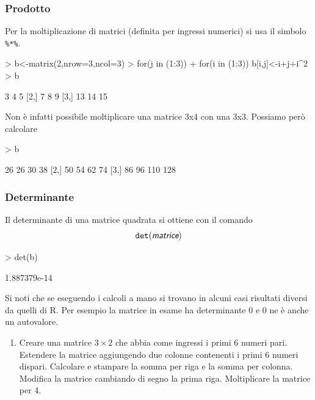 \documentclass[onecolumn,11pt]{book}
\newcommand{\varia}[1]{\textsl{\textsf{#1}}}
\begin{document}
\subsubsection{Prodotto}
Per la  moltiplicazione di matrici (definita per ingressi numerici) si usa il simbolo \texttt{\%*\%}.
\begin{Schunk}
\begin{Sinput}
> b<-matrix(2,nrow=3,ncol=3)
> for(j in (1:3)) 
+ for(i in (1:3)) b[i,j]<-i+j+i^2
> b
\end{Sinput}
\begin{Soutput}
     [,1] [,2] [,3]
[1,]    3    4    5
[2,]    7    8    9
[3,]   13   14   15
\end{Soutput}
\end{Schunk}
Non \`e infatti possibile moltiplicare una matrice 3x4 con una 3x3. Possiamo per\`o calcolare
\begin{Schunk}
\begin{Sinput}
> b%
\end{Sinput}
\begin{Soutput}
     [,1] [,2] [,3] [,4]
[1,]   26   26   30   38
[2,]   50   54   62   74
[3,]   86   96  110  128
\end{Soutput}
\end{Schunk}
\subsubsection{Determinante} Il determinante di una matrice quadrata si ottiene con il comando
\begin{equation}\texttt{det} (\varia{matrice})\end{equation}
\begin{Schunk}
\begin{Sinput}
> det(b)
\end{Sinput}
\begin{Soutput}
[1] 1.887379e-14
\end{Soutput}
\end{Schunk}
 
Si noti che se eseguendo i calcoli a mano si trovano in alcuni casi risultati diversi da quelli di {\textsf R}. Per esempio la matrice in esame ha determinante 0 e 0 ne \`e anche un autovalore.
\begin{shaded}
 \begin{enumerate}
 \item{}Creare una matrice $3\times 2$ che abbia come ingressi i primi 6 numeri pari. Estendere la matrice aggiungendo due colonne contenenti i primi 6 numeri dispari. Calcolare e stampare la somma per riga e la somma per colonna. Modifica la matrice cambiando di segno la prima riga. Moltiplicare la matrice  per 4.  
 \end{enumerate}
 \end{shaded}
\end{document}
